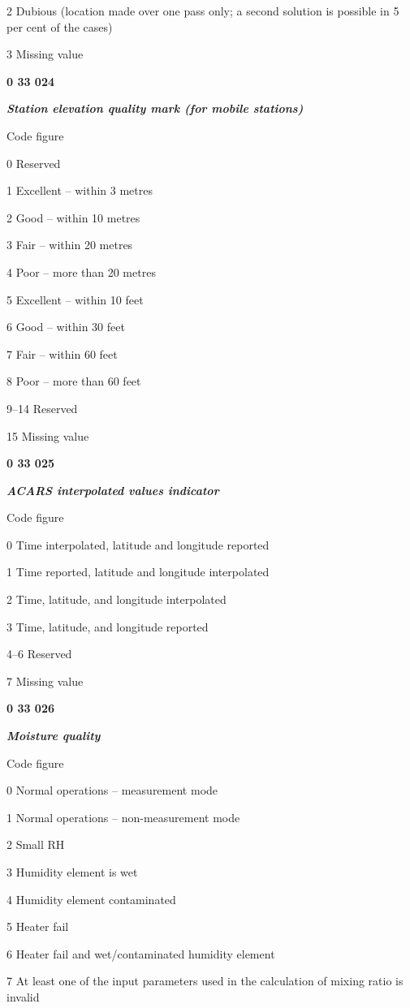2 Dubious (location made over one pass only; a second solution is possible in 5 per cent of the cases)

3 Missing value

\textbf{0 33 024}

\emph{\textbf{Station elevation quality mark (for mobile stations)}}

Code figure

0 Reserved

1 Excellent -- within 3 metres

2 Good -- within 10 metres

3 Fair -- within 20 metres

4 Poor -- more than 20 metres

5 Excellent -- within 10 feet

6 Good -- within 30 feet

7 Fair -- within 60 feet

8 Poor -- more than 60 feet

9--14 Reserved

15 Missing value

\textbf{0 33 025}

\emph{\textbf{ACARS interpolated values indicator}}

Code figure

0 Time interpolated, latitude and longitude reported

1 Time reported, latitude and longitude interpolated

2 Time, latitude, and longitude interpolated

3 Time, latitude, and longitude reported

4--6 Reserved

7 Missing value

\textbf{0 33 026}

\emph{\textbf{Moisture quality}}

Code figure

0 Normal operations -- measurement mode

1 Normal operations -- non-measurement mode

2 Small RH

3 Humidity element is wet

4 Humidity element contaminated

5 Heater fail

6 Heater fail and wet/contaminated humidity element

7 At least one of the input parameters used in the calculation of mixing ratio is invalid

